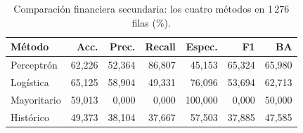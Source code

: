 \begin{table}[htbp]
\centering\small
\caption{Comparación financiera secundaria: los cuatro métodos en 1\,276 filas (\%).}\label{tab:tf-comun}
\begin{tabular}{lrrrrrr}\toprule
Método & Acc. & Prec. & Recall & Espec. & F1 & BA \\ \midrule
Perceptrón & 62,226 & 52,364 & 86,807 & 45,153 & 65,324 & 65,980 \\
Logística & 65,125 & 58,904 & 49,331 & 76,096 & 53,694 & 62,713 \\
Mayoritario & 59,013 & 0,000 & 0,000 & 100,000 & 0,000 & 50,000 \\
Histórico & 49,373 & 38,104 & 37,667 & 57,503 & 37,885 & 47,585 \\
\bottomrule\end{tabular}
\end{table}

